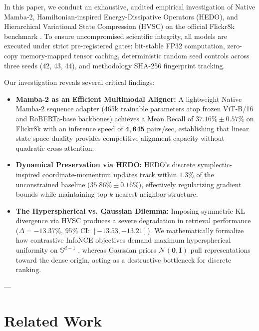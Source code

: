 \documentclass[journal]{IEEEtran}
\begin{document}
In this paper, we conduct an exhaustive, audited empirical investigation of Native Mamba-2, Hamiltonian-inspired Energy-Dissipative Operators (HEDO), and Hierarchical Variational State Compression (HVSC) on the official Flickr8k benchmark \cite{hodosh2013framing}. To ensure uncompromised scientific integrity, all models are executed under strict pre-registered gates: bit-stable FP32 computation, zero-copy memory-mapped tensor caching, deterministic random seed controls across three seeds (42, 43, 44), and methodology SHA-256 fingerprint tracking.

Our investigation reveals several critical findings:
\begin{itemize}
    \item \textbf{Mamba-2 as an Efficient Multimodal Aligner:} A lightweight Native Mamba-2 sequence adapter (465k trainable parameters atop frozen ViT-B/16 and RoBERTa-base backbones) achieves a Mean Recall of $\mathbf{37.16\% \pm 0.57\%}$ on Flickr8k with an inference speed of $\mathbf{4,645}$ pairs/sec, establishing that linear state space duality provides competitive alignment capacity without quadratic cross-attention.
    \item \textbf{Dynamical Preservation via HEDO:} HEDO's discrete symplectic-inspired coordinate-momentum updates track within $1.3\%$ of the unconstrained baseline ($35.86\% \pm 0.16\%$), effectively regularizing gradient bounds while maintaining top-$k$ nearest-neighbor structure.
    \item \textbf{The Hyperspherical vs. Gaussian Dilemma:} Imposing symmetric KL divergence via HVSC produces a severe degradation in retrieval performance ($\Delta = -13.37\%$, $95\%\text{ CI: } [-13.53, -13.21]$). We mathematically formalize how contrastive InfoNCE objectives demand maximum hyperspherical uniformity on $\mathbb{S}^{d-1}$ \cite{wang2020understanding}, whereas Gaussian priors $\mathcal{N}(\mathbf{0}, \mathbf{I})$ pull representations toward the dense origin, acting as a destructive bottleneck for discrete ranking.
\end{itemize}

---

\section{Related Work}
\end{document}
